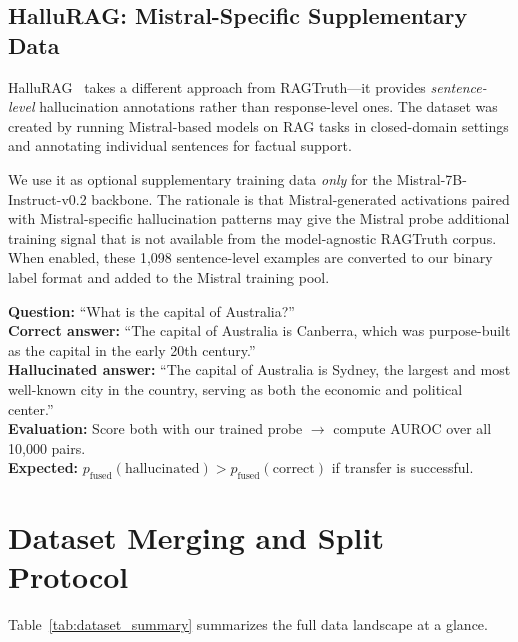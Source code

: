 \subsection{HalluRAG: Mistral-Specific Supplementary Data}
\label{sec:hallurag}

HalluRAG~\cite{frohling2024hallurag} takes a different approach from RAGTruth—it provides \emph{sentence-level} hallucination annotations rather than response-level ones. The dataset was created by running Mistral-based models on RAG tasks in closed-domain settings and annotating individual sentences for factual support.

We use it as optional supplementary training data \emph{only} for the Mistral-7B-Instruct-v0.2 backbone. The rationale is that Mistral-generated activations paired with Mistral-specific hallucination patterns may give the Mistral probe additional training signal that is not available from the model-agnostic RAGTruth corpus. When enabled, these 1{,}098 sentence-level examples are converted to our binary label format and added to the Mistral training pool.

\begin{dataformatbox}
\small
\textbf{Question:} ``What is the capital of Australia?''\\[3pt]
\textbf{Correct answer:} ``The capital of Australia is Canberra, which was purpose-built as the capital in the early 20th century.''\\[3pt]
\textbf{Hallucinated answer:} ``The capital of Australia is Sydney, the largest and most well-known city in the country, serving as both the economic and political center.''\\[3pt]
\textbf{Evaluation:} Score both with our trained probe $\to$ compute AUROC over all 10{,}000 pairs.\\[2pt]
\textbf{Expected:} $p_{\text{fused}}(\text{hallucinated}) > p_{\text{fused}}(\text{correct})$ if transfer is successful.
\end{dataformatbox}

\section{Dataset Merging and Split Protocol}
\label{sec:split_protocol}

Table~\ref{tab:dataset_summary} summarizes the full data landscape at a glance.

